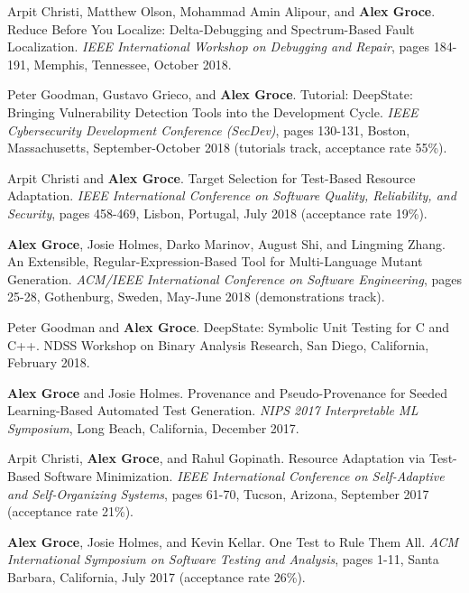 \documentclass[ComputerScience]{vita}
\begin{document}
\begin{vita}
\begin{Refereed Conference and Workshop Publications}
\item Arpit Christi, Matthew Olson, Mohammad Amin Alipour, and {\bf Alex Groce}. 
\newblock Reduce Before You Localize: Delta-Debugging and Spectrum-Based Fault Localization. 
\newblock \emph{IEEE International Workshop on Debugging and Repair},
pages 184-191, Memphis, Tennessee, October  2018.

\item Peter Goodman, Gustavo Grieco,  and {\bf Alex Groce}. 
\newblock Tutorial: DeepState: Bringing Vulnerability Detection Tools 
into the Development Cycle. 
\newblock \emph{IEEE Cybersecurity Development Conference (SecDev)},
pages 130-131, Boston, Massachusetts, September-October 2018 (tutorials track, 
acceptance rate 55\%). 

\item Arpit Christi and {\bf Alex Groce}.
\newblock Target Selection for Test-Based Resource Adaptation.
\newblock \emph{IEEE International Conference on Software Quality,
  Reliability, and Security}, pages 458-469, 
Lisbon, Portugal, July 2018 (acceptance rate 19\%).

\item {\bf Alex Groce},  Josie Holmes, Darko Marinov, August Shi, and Lingming Zhang.
\newblock An Extensible, Regular-Expression-Based Tool for Multi-Language Mutant Generation.
\newblock \emph{ACM/IEEE International Conference on Software
  Engineering}, pages 25-28, Gothenburg, Sweden, May-June 2018 (demonstrations track).

\item Peter Goodman and {\bf Alex Groce}.
\newblock DeepState: Symbolic Unit Testing for C and C++.
\newblock NDSS Workshop on Binary Analysis Research, San Diego, California, February 2018.

\item {\bf Alex Groce} and Josie Holmes.
\newblock Provenance and Pseudo-Provenance for Seeded Learning-Based Automated Test Generation.
\newblock \emph{NIPS 2017 Interpretable ML Symposium}, Long Beach, California, December 2017.

\item Arpit Christi, {\bf Alex Groce}, and Rahul Gopinath.
\newblock Resource Adaptation via Test-Based Software Minimization.
\newblock \emph{IEEE International Conference on Self-Adaptive and Self-Organizing Systems}, pages 61-70, Tucson, Arizona, September 2017 (acceptance rate 21\%).

\item {\bf Alex Groce}, Josie Holmes, and Kevin Kellar.
\newblock One Test to Rule Them All.
\newblock \emph{ACM International Symposium on Software Testing and Analysis}, pages 1-11, Santa Barbara, California, July 2017 (acceptance rate 26\%).


\end{Refereed Conference and Workshop Publications}
\end{vita}
\end{document}

